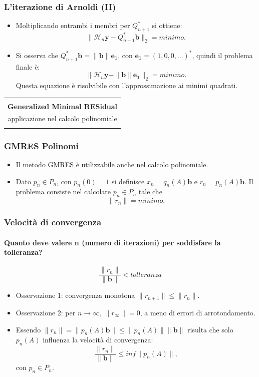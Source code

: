 \documentclass[10pt]{beamer}
\begin{document}
\begin{frame} \frametitle{L'iterazione di Arnoldi (II)}
\begin{itemize}
    \item Moltiplicando entrambi i membri per $Q^*_{n+1}$ si ottiene: $$\|\mathcal{H}_n\mathbf{y}-Q^*_{n+1}\mathbf{b}\|_2 = minimo.$$
    \item Si osserva che $Q^*_{n+1}\mathbf{b}=\|\mathbf{b}\|\mathbf{e_1}$, con $\mathbf{e_1}=(1,0,0,\dots)^*$, quindi il problema 
    finale è:$$\|\mathcal{H}_n\mathbf{y}-\|\mathbf{b}\|\mathbf{e_1}\|_2 = minimo.$$ Questa equazione è risolvibile con l'approssimazione ai minimi quadrati.
\end{itemize}


\end{frame}

\begin{frame} 
\begin{center}
\begin{tabular}{ c }
\hline\\
\textbf{Generalized Minimal RESidual} \\ [0.5ex]
applicazione nel calcolo polinomiale\\ \\
 \hline
\end{tabular}
\end{center}
\end{frame}

\begin{frame} \frametitle{GMRES Polinomi}
\begin{itemize}
    \item Il metodo GMRES è utilizzabile anche nel calcolo polinomiale.
    \item Dato $p_n\in P_n$, con $p_n(0)=1$ si definisce $x_n=q_n(A)\mathbf{b}$ e $r_n=p_n(A)\mathbf{b}$. Il problema consiste nel calcolare $p_n\in P_n$ tale che $$\|r_n\|=minimo.$$
\end{itemize}
\end{frame}


\begin{frame} \frametitle{Velocità di convergenza}\framesubtitle{Quanto deve valere \textbf{n} (numero di iterazioni) per soddisfare la tolleranza?}
    $$ \frac{\|r_n\|}{\|\mathbf{b}\|}  < tolleranza$$
\begin{itemize}
    \item Osservazione 1: convergenza monotona $\|r_{n+1}\|\leq \|r_n\|$.
    \item Osservazione 2: per $n\to \infty$, $\|r_{\infty} \|= 0$, a meno di errori di arrotondamento.
    \item Essendo $\|r_n\| = \|p_n(A) \mathbf{b}\| \leq\|p_n(A)\|\|\mathbf{b}\|$ risulta che solo $p_n(A)$ influenza la velocità di convergenza: $$\frac{\|r_n\|}{\|\mathbf{b}\|} \leq inf\|p_n(A)\|,$$ con $p_n \in P_n$.
\end{itemize}
\end{frame}
\end{document}
